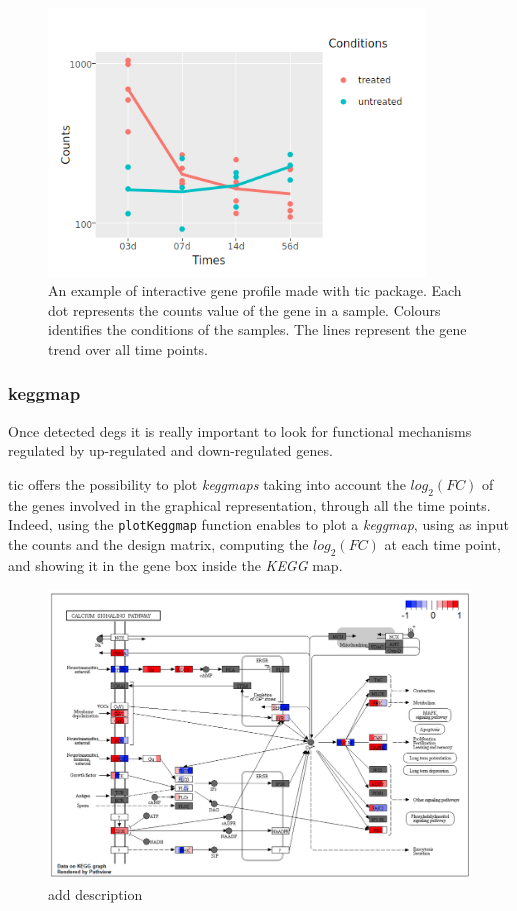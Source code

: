 \begin{figure}[H]
\centering
\includegraphics[width=10cm, keepaspectratio]{img/ticorser/gene_trend.png}
\caption[ticorser gene profile]{An example of interactive gene profile made with \gls{tic} package. Each dot represents the counts value of the gene in a sample. Colours identifies the conditions of the samples. The lines represent the gene trend over all time points.}
\label{fig:ticorsergenetrend}
\end{figure}


\subsubsection{keggmap}
Once detected \glspl{deg} it is really important to look for functional mechanisms regulated by up-regulated and down-regulated genes. 

\gls{tic} offers the possibility to plot \textit{keggmaps}\cite{Kanehisa2016} taking into account the $log_2(FC)$ of the genes involved in the graphical representation, through all the time points.
Indeed, using the \lstinline!plotKeggmap! function enables to plot a \textit{keggmap}, using as input the counts and the design matrix, computing the $log_2(FC)$ at each time point, and showing it in the gene box inside the \textit{KEGG} map.

\begin{figure}[H]
\includegraphics[width=12cm, keepaspectratio]{img/ticorser/keggmap_example.png}
\caption[ticorser keggmap]{add description}
\label{fig:ticorserkeggmap}
\centering
\end{figure}








